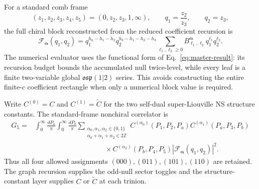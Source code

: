\documentclass[11pt]{article}
\newcommand{\osp}{\mathfrak{osp}(1|2)}
\newcommand{\F}{\mathcal F}
\begin{document}
For a standard comb frame
\begin{equation}
 (z_1,z_2,z_3,z_4,z_5)=(0,z_2,z_3,1,\infty),
 \qquad
 q_1=\frac{z_2}{z_3},\qquad q_2=z_3,
 \label{eq:fivepoint-standard-comb-coordinates}
\end{equation}
the full chiral block reconstructed from the reduced coefficient recursion is
\begin{equation}
 \F_{\bm\alpha}(q_1,q_2)
 =q_1^{h_a-h_1-h_2}
  q_2^{h_b-h_1-h_2-h_3}
  \sum_{\ell_1,\ell_2\geq0}
  B^{\bm\alpha}_{\ell_1,\ell_2}
  q_1^{\ell_1}q_2^{\ell_2}.
 \label{eq:fivepoint-full-comb-block}
\end{equation}
The numerical evaluator uses the functional form of
Eq.~\eqref{eq:master-result}: its recursion budget bounds the accumulated
null twice-level, while every leaf is a finite two-variable global
\(\osp\) series.  This avoids constructing the entire finite-\(c\)
coefficient rectangle when only a numerical block value is required.

Write \(C^{(0)}=C\) and \(C^{(1)}=\widetilde C\) for the two self-dual
super-Liouville NS structure constants.  The standard-frame nonchiral
correlator is
\begin{align}
 G_5={}&
 \int_0^\infty\frac{dP_a}{\pi}
 \int_0^\infty\frac{dP_b}{\pi}
 \sum_{\substack{\alpha_0,\alpha_1,\alpha_2\in\{0,1\}\\
                  \alpha_0+\alpha_1+\alpha_2\in2\mathbb Z}}
 C^{(\alpha_0)}(P_1,P_2,P_a)
 C^{(\alpha_1)}(P_a,P_3,P_b)
 \nonumber\\[-0.2em]
 &\hspace{10em}\times
 C^{(\alpha_2)}(P_b,P_4,P_5)
 \left|\F_{\bm\alpha}(q_1,q_2)\right|^2.
 \label{eq:fivepoint-nonchiral-sewing}
\end{align}
Thus all four allowed assignments
\((000),(011),(101),(110)\) are retained.  The graph recursion supplies the
odd-null sector toggles and the structure-constant layer supplies \(C\) or
\(\widetilde C\) at each trinion.
\end{document}
